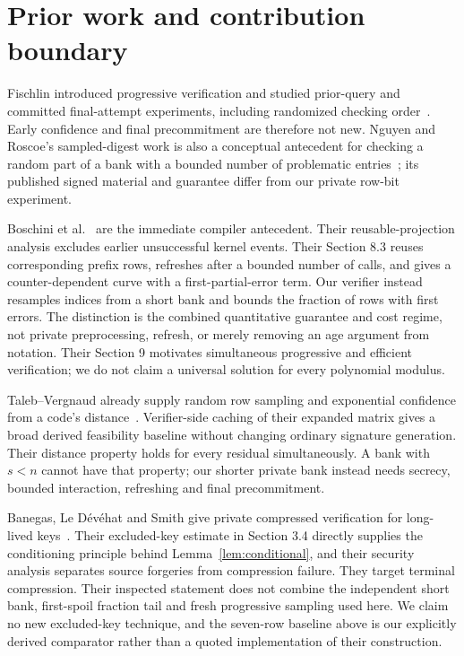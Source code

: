 \documentclass[11pt,letterpaper]{article}
\theoremstyle{definition}
\begin{document}
\section{Prior work and contribution boundary}
\label{sec:prior}
Fischlin introduced progressive verification and studied prior-query and committed final-attempt experiments, including randomized checking order~\cite{fischlin}. Early confidence and final precommitment are therefore not new. Nguyen and Roscoe's sampled-digest work is also a conceptual antecedent for checking a random part of a bank with a bounded number of problematic entries~\cite{nr}; its published signed material and guarantee differ from our private row-bit experiment.

Boschini et al.~\cite{bfp} are the immediate compiler antecedent. Their reusable-projection analysis excludes earlier unsuccessful kernel events. Their Section 8.3 reuses corresponding prefix rows, refreshes after a bounded number of calls, and gives a counter-dependent curve with a first-partial-error term. Our verifier instead resamples indices from a short bank and bounds the fraction of rows with first errors. The distinction is the combined quantitative guarantee and cost regime, not private preprocessing, refresh, or merely removing an age argument from notation. Their Section 9 motivates simultaneous progressive and efficient verification; we do not claim a universal solution for every polynomial modulus.

Taleb--Vergnaud already supply random row sampling and exponential confidence from a code's distance~\cite{tv}. Verifier-side caching of their expanded matrix gives a broad derived feasibility baseline without changing ordinary signature generation. Their distance property holds for every residual simultaneously. A bank with $s<n$ cannot have that property; our shorter private bank instead needs secrecy, bounded interaction, refreshing and final precommitment.

Banegas, Le D\'ev\'ehat and Smith give private compressed verification for long-lived keys~\cite{bls}. Their excluded-key estimate in Section 3.4 directly supplies the conditioning principle behind Lemma~\ref{lem:conditional}, and their security analysis separates source forgeries from compression failure. They target terminal compression. Their inspected statement does not combine the independent short bank, first-spoil fraction tail and fresh progressive sampling used here. We claim no new excluded-key technique, and the seven-row baseline above is our explicitly derived comparator rather than a quoted implementation of their construction.
\end{document}
